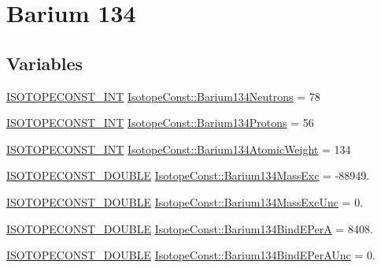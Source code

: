 \hypertarget{group___isotope_const-_barium-_ba134}{}\section{Barium 134}
\label{group___isotope_const-_barium-_ba134}
\subsection*{Variables}
\begin{DoxyCompactItemize}
\item 
\mbox{\hyperlink{group___isotope_const-_macros_ga5f18360b3e99483a35c32d789e62621c}{I\+S\+O\+T\+O\+P\+E\+C\+O\+N\+S\+T\+\_\+\+I\+NT}} \mbox{\hyperlink{group___isotope_const-_barium-_ba134_gac3d1ecad94daee22a16ba9f3e88948f1}{Isotope\+Const\+::\+Barium134\+Neutrons}} = 78
\item 
\mbox{\hyperlink{group___isotope_const-_macros_ga5f18360b3e99483a35c32d789e62621c}{I\+S\+O\+T\+O\+P\+E\+C\+O\+N\+S\+T\+\_\+\+I\+NT}} \mbox{\hyperlink{group___isotope_const-_barium-_ba134_ga30b11d7d5ee7dbe565a6db183de3349c}{Isotope\+Const\+::\+Barium134\+Protons}} = 56
\item 
\mbox{\hyperlink{group___isotope_const-_macros_ga5f18360b3e99483a35c32d789e62621c}{I\+S\+O\+T\+O\+P\+E\+C\+O\+N\+S\+T\+\_\+\+I\+NT}} \mbox{\hyperlink{group___isotope_const-_barium-_ba134_ga73ebb72a373caa2506d7bba815d89e26}{Isotope\+Const\+::\+Barium134\+Atomic\+Weight}} = 134
\item 
\mbox{\hyperlink{group___isotope_const-_macros_ga8f45a7272ce02c0b4c65c44636ed719a}{I\+S\+O\+T\+O\+P\+E\+C\+O\+N\+S\+T\+\_\+\+D\+O\+U\+B\+LE}} \mbox{\hyperlink{group___isotope_const-_barium-_ba134_ga58df3934c6c878f1479992f25af3373b}{Isotope\+Const\+::\+Barium134\+Mass\+Exc}} = -\/88949.
\item 
\mbox{\hyperlink{group___isotope_const-_macros_ga8f45a7272ce02c0b4c65c44636ed719a}{I\+S\+O\+T\+O\+P\+E\+C\+O\+N\+S\+T\+\_\+\+D\+O\+U\+B\+LE}} \mbox{\hyperlink{group___isotope_const-_barium-_ba134_ga915fd84c73e27a6b4ebd34715c513633}{Isotope\+Const\+::\+Barium134\+Mass\+Exc\+Unc}} = 0.
\item 
\mbox{\hyperlink{group___isotope_const-_macros_ga8f45a7272ce02c0b4c65c44636ed719a}{I\+S\+O\+T\+O\+P\+E\+C\+O\+N\+S\+T\+\_\+\+D\+O\+U\+B\+LE}} \mbox{\hyperlink{group___isotope_const-_barium-_ba134_ga983a0daa8d239c30008eee7d87b05ee5}{Isotope\+Const\+::\+Barium134\+Bind\+E\+PerA}} = 8408.
\item 
\mbox{\hyperlink{group___isotope_const-_macros_ga8f45a7272ce02c0b4c65c44636ed719a}{I\+S\+O\+T\+O\+P\+E\+C\+O\+N\+S\+T\+\_\+\+D\+O\+U\+B\+LE}} \mbox{\hyperlink{group___isotope_const-_barium-_ba134_ga0b8dda1161eba54e3417ce2523003c88}{Isotope\+Const\+::\+Barium134\+Bind\+E\+Per\+A\+Unc}} = 0.

\end{DoxyCompactItemize}
